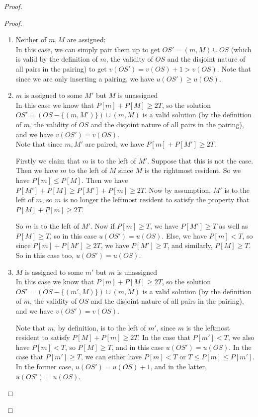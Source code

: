 \documentclass[answers]{exam}
\newcommand{\nl}{\vspace{0.2cm}\\}
\begin{document}
\begin{questions}
\begin{solution}
\begin{proof}
\begin{proof}
\begin{enumerate}
    \item Neither of $m, M$ are assigned:\nl
    In this case, we can simply pair them up to get $OS' = (m, M) \cup OS$ (which is valid by the definition of $m$, the validity of $OS$ and the disjoint nature of all pairs in the pairing) to get $v(OS') = v(OS) + 1 > v(OS)$. Note that since we are only inserting a pairing, we have $u(OS') \ge u(OS)$.
    
    \item $m$ is assigned to some $M'$ but $M$ is unassigned\nl 
    In this case we know that $P[m] + P[M] \ge 2T$, so the solution $OS' = \left(OS - \{(m, M')\}\right) \cup (m, M)$ is a valid solution (by the definition of $m$, the validity of $OS$ and the disjoint nature of all pairs in the pairing), and we have $v(OS') = v(OS)$.\nl
    Note that since $m, M'$ are paired, we have $P[m] + P[M'] \ge 2T$. 
    
    Firstly we claim that $m$ is to the left of $M'$. Suppose that this is not the case. Then we have $m$ to the left of $M$ since $M$ is the rightmost resident. So we have $P[m] \le P[M]$. Then we have $P[M'] + P[M] \ge P[M'] + P[m] \ge 2T$. Now by assumption, $M'$ is to the left of $m$, so $m$ is no longer the leftmost resident to satisfy the property that $P[M] + P[m] \ge 2T$.
    
    So $m$ is to the left of $M'$. Now if $P[m] \ge T$, we have $P[M'] \ge T$ as well as $P[M] \ge T$, so in this case $u(OS') = u(OS)$. Else, we have $P[m] < T$, so since $P[m] + P[M'] \ge 2T$, we have $P[M'] \ge T$, and similarly, $P[M] \ge T$. So in this case too, $u(OS') = u(OS)$.
    
    \item $M$ is assigned to some $m'$ but $m$ is unassigned\nl
    In this case we know that $P[m] + P[M] \ge 2T$, so the solution $OS' = \left(OS - \{(m', M)\}\right) \cup (m, M)$ is a valid solution (by the definition of $m$, the validity of $OS$ and the disjoint nature of all pairs in the pairing), and we have $v(OS') = v(OS)$.
    
    Note that $m$, by definition, is to the left of $m'$, since $m$ is the leftmost resident to satisfy $P[M] + P[m] \ge 2T$. In the case that $P[m'] < T$, we also have $P[m] < T$, so $P[M] \ge T$, and in this case $u(OS') = u(OS)$. In the case that $P[m'] \ge T$, we can either have $P[m] < T$ or $T \le P[m] \le P[m']$. In the former case, $u(OS') = u(OS) + 1$, and in the latter, $u(OS') = u(OS)$.
    

\end{enumerate}
\end{proof}
\end{proof}
\end{solution}
\end{questions}
\end{document}
